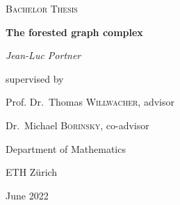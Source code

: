 \begin{titlepage}
	\centering
	\vspace*{\fill}
	{\scshape\huge Bachelor Thesis\par}
	\vspace{1.5cm}
	{\Huge\bfseries The forested graph complex\par}
	\vspace{1.5cm}
	{\LARGE\itshape Jean-Luc Portner\par}
	\vspace{2cm}
	{\large supervised by\par
	Prof. Dr.~Thomas \textsc{Willwacher}, advisor\par
Dr.~Michael \textsc{Borinsky}, co-advisor\par}
	\vspace{3cm}
	{\large Department of Mathematics\par
	ETH Zürich\par
	June 2022}
	\vfill
\end{titlepage}
